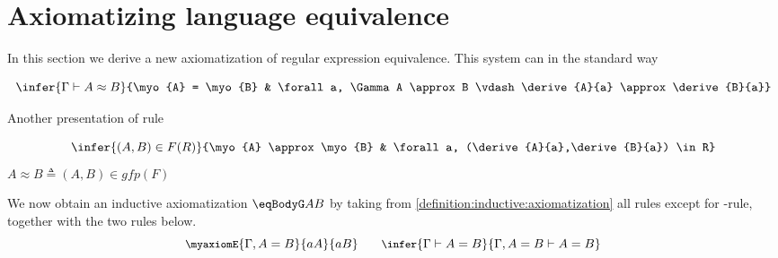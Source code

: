 \section{Axiomatizing language equivalence}

In this section we derive a new axiomatization of regular expression equivalence.
 This system can in the standard way 
\begin{definition}
\[\infer{\Gamma \vdash A \approx B}{\myo{A} = \myo{B} & \forall a, \Gamma A \approx B \vdash \derive{A}{a} \approx \derive{B}{a}}\]
\end{definition}
Another presentation of rule
\begin{definition}
\begin{displaymath}
\infer{(A,B) \in F(R)}{\myo{A} \approx \myo{B} & \forall a, (\derive{A}{a},\derive{B}{a}) \in R}
\end{displaymath}
$A \approx B  \triangleq (A,B) \in gfp(F)$
\end{definition}




\begin{definition} \label{definition:inductive:axiomatization}
We now obtain an inductive axiomatization $\eqBodyG A B$ by taking from \ref{definition:inductive:axiomatization} all rules except for -rule, together with the two rules below.
\begin{displaymath}\small
\myaxiomE{\Gamma , A = B}{aA}{aB} \qquad
\infer{\Gamma \vdash A = B}{\Gamma, A = B \vdash A = B}
\end{displaymath}
\end{definition}

